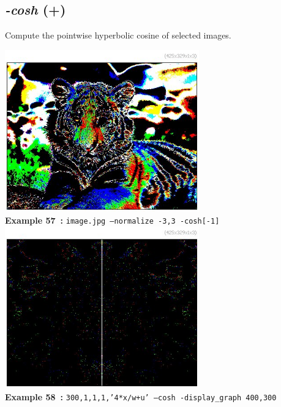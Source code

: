 \documentclass[a4paper,11pt,twoside]{book}
\begin{document}
\subsection{\emph{-cosh} (+)}\vspace*{-0.5em}
Compute the pointwise hyperbolic cosine of selected images.
\begin{center}\includegraphics[keepaspectratio=true,height=7cm,width=\textwidth]{img/gmic_def57.jpg}\\
{\footnotesize \textbf{Example 57~:} \texttt{image.jpg --normalize -3,3 -cosh[-1]}}
\\\includegraphics[keepaspectratio=true,height=7cm,width=\textwidth]{img/gmic_def58.jpg}\\
{\footnotesize \textbf{Example 58~:} \texttt{300,1,1,1,'4*x/w+u' --cosh -display\_graph 400,300}}
\end{center}
\end{document}
